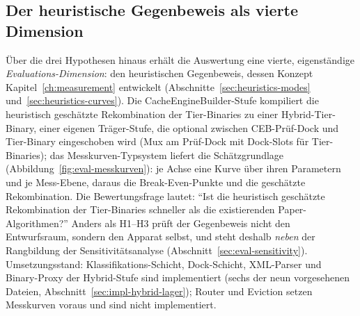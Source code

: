 \begin{nurkurz}
\subsection{Der heuristische Gegenbeweis als vierte Dimension}\label{sec:eval-counterproof}
Über die drei Hypothesen hinaus erhält die Auswertung eine vierte, eigenständige
\emph{Evaluations-Dimension}: den heuristischen Gegenbeweis, dessen Konzept Kapitel~\ref{ch:measurement}
entwickelt (Abschnitte~\ref{sec:heuristics-modes} und~\ref{sec:heuristics-curves}). Die
CacheEngineBuilder-Stufe kompiliert die heuristisch geschätzte Rekombination der Tier-Binaries zu einer
Hybrid-Tier-Binary, einer eigenen Träger-Stufe, die optional zwischen CEB-Prüf-Dock und Tier-Binary
eingeschoben wird (Mux am Prüf-Dock mit Dock-Slots für Tier-Binaries); das Messkurven-Typsystem liefert die
Schätzgrundlage (Abbildung~\ref{fig:eval-messkurven}): je Achse eine Kurve über ihren Parametern und je
Mess-Ebene, daraus die Break-Even-Punkte und die geschätzte Rekombination. Die Bewertungsfrage lautet:
\enquote{Ist die heuristisch geschätzte Rekombination der Tier-Binaries schneller als die existierenden
Paper-Algorithmen?} Anders als H1--H3 prüft der Gegenbeweis nicht den Entwurfsraum, sondern den Apparat
selbst, und steht deshalb \emph{neben} der Rangbildung der Sensitivitätsanalyse
(Abschnitt~\ref{sec:eval-sensitivity}).
Umsetzungsstand: Klassifikations-Schicht, Dock-Schicht, XML-Parser und Binary-Proxy der Hybrid-Stufe sind
implementiert (sechs der neun vorgesehenen Dateien, Abschnitt~\ref{sec:impl-hybrid-lager}); Router und
Eviction setzen Messkurven voraus und sind nicht implementiert.
\begin{figure}[htbp]\centering
\end{figure}
\end{nurkurz}
